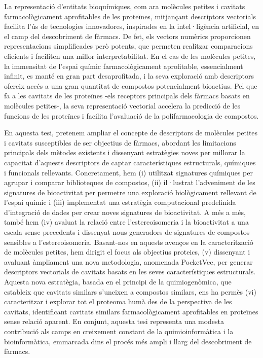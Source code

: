 
La representació d'entitats bioquímiques, com ara molècules petites i cavitats farmacològicament aprofitables de les proteïnes, mitjançant descriptors vectorials facilita l'ús de tecnologies innovadores, inspirades en la intel·ligència artificial, en el camp del descobriment de fàrmacs. De fet, els vectors numèrics proporcionen representacions simplificades però potents, que permeten realitzar comparacions eficients i faciliten una millor interpretabilitat. En el cas de les molècules petites, la immensitat de l'espai químic farmacològicament aprofitable, essencialment infinit, es manté en gran part desaprofitada, i la seva exploració amb descriptors ofereix accés a una gran quantitat de compostos potencialment bioactius. Pel que fa a les cavitats de les proteïnes -els receptors principals dels fàrmacs basats en molècules petites-, la seva representació vectorial accelera la predicció de les funcions de les proteïnes i facilita l'avaluació de la polifarmacologia de compostos. 

En aquesta tesi, pretenem ampliar el concepte de descriptors de molècules petites i cavitats susceptibles de ser objectius de fàrmacs, abordant les limitacions principals dels mètodes existents i dissenyant estratègies noves per millorar la capacitat d'aquests descriptors de captar característiques estructurals, químiques i funcionals rellevants. Concretament, hem (i) utilitzat signatures químiques per agrupar i comparar biblioteques de compostos, (ii) il·lustrat l'adveniment de les signatures de bioactivitat per permetre una exploració biològicament rellevant de l'espai químic i (iii) implementat una estratègia computacional predefinida d'integració de dades per crear noves signatures de bioactivitat. A més a més, també hem (iv) avaluat la relació entre l'estereoisomeria i la bioactivitat a una escala sense precedents i dissenyat nous generadors de signatures de compostos sensibles a l'estereoisomeria. Basant-nos en aquests avenços en la caracterització de molècules petites, hem dirigit el focus als objectius proteics, (v) dissenyant i avaluant àmpliament una nova metodologia, anomenada PocketVec, per generar descriptors vectorials de cavitats basats en les seves característiques estructurals. Aquesta nova estratègia, basada en el principi de la quimiogenòmica, que estableix que cavitats similars s'uneixen a compostos similars, ens ha permès (vi) caracteritzar i explorar tot el proteoma humà des de la perspectiva de les cavitats, identificant cavitats similars farmacològicament aprofitables en proteïnes sense relació aparent. En conjunt, aquesta tesi representa una modesta contribució als camps en creixement constant de la quimioinformàtica i la bioinformàtica, emmarcada dins el procés més ampli i llarg del descobriment de fàrmacs.